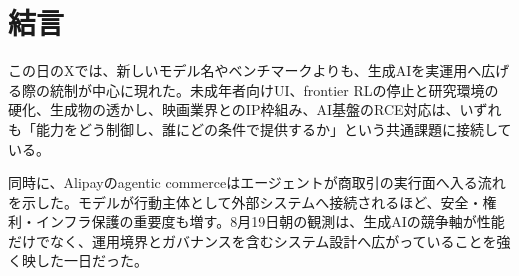 \section*{結言}
この日のXでは、新しいモデル名やベンチマークよりも、生成AIを実運用へ広げる際の統制が中心に現れた。未成年者向けUI、frontier RLの停止と研究環境の硬化、生成物の透かし、映画業界とのIP枠組み、AI基盤のRCE対応は、いずれも「能力をどう制御し、誰にどの条件で提供するか」という共通課題に接続している。

同時に、Alipayのagentic commerceはエージェントが商取引の実行面へ入る流れを示した。モデルが行動主体として外部システムへ接続されるほど、安全・権利・インフラ保護の重要度も増す。8月19日朝の観測は、生成AIの競争軸が性能だけでなく、運用境界とガバナンスを含むシステム設計へ広がっていることを強く映した一日だった。
